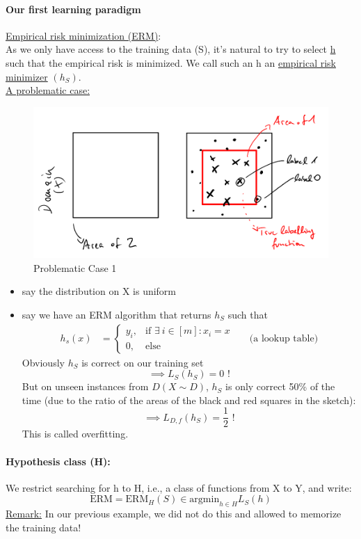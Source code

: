 \documentclass[10pt,a4paper]{article}
\theoremstyle{definition}
\theoremstyle{plain}
\begin{document}
\paragraph{Our first learning paradigm} \underline{Empirical risk minimization (ERM)}:\\
As we only have access to the training data (S), it's natural to try to select \underline{h} such that the empirical risk is minimized. We call such an h an \underline{empirical risk minimizer} $(h_S)$.\\

\underline{A problematic case:}
\begin{figure}[H]
	\centering
	\includegraphics[width=0.7\linewidth]{sketch_1}
	\caption{Problematic Case 1}
	\label{fig:sketch1}
\end{figure}

\begin{itemize}
	\item say the distribution on X is uniform
	\item say we have an ERM algorithm that returns $h_S$ such that 
	\begin{align*}
			 h_s(x) &= \begin{cases}
			y_i , &  \text{if } \exists \ i \in [m]: x_i = x  \\
			0 , &  \text{else} 
		\end{cases} && \text{(a lookup table)} 
	\end{align*}
	Obviously $h_S$ is correct on our training set $$\implies L_S(h_S) = 0\text{ !}$$
	But on unseen instances from $D (X \sim D)$, $h_S$ is only correct 50\% of the time (due to the ratio of the areas of the black and red squares in the sketch): $$\implies L_{D,f}(h_S) = \frac{1}{2} \text{ !}$$
	This is called overfitting.
\end{itemize}

\paragraph{Hypothesis class (H):} We restrict searching for h to H, i.e., a class of functions from X to Y, and write:
$$
\text{ERM} = \text{ERM}_{H} (S) \in \text{argmin}_{h \in H} L_{S}(h)
$$
\underline{Remark:} In our previous example, we did not do this and allowed to memorize the training data!
\end{document}
